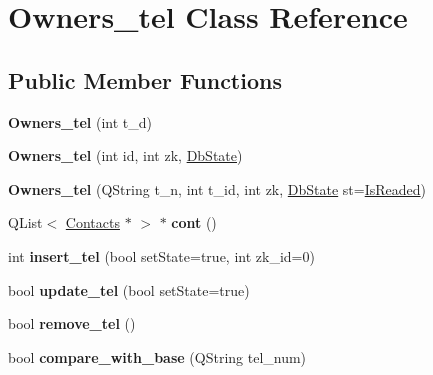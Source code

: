 \hypertarget{class_owners__tel}{}\section{Owners\+\_\+tel Class Reference}
\label{class_owners__tel}
\subsection*{Public Member Functions}
\begin{DoxyCompactItemize}
\item 
\mbox{\label{class_owners__tel_aee47f63acbceb924bba71ef318d2a377}} 
{\bfseries Owners\+\_\+tel} (int t\+\_\+d)
\item 
\mbox{\label{class_owners__tel_a80e3dd0faa358c821f4136983cae8b6e}} 
{\bfseries Owners\+\_\+tel} (int id, int zk, \mbox{\hyperlink{___contacts_8h_ad709f09dcd44386da4fec847f603fa4c}{Db\+State}})
\item 
\mbox{\label{class_owners__tel_a82ada689e8d87036c91aae6dec8ffced}} 
{\bfseries Owners\+\_\+tel} (Q\+String t\+\_\+n, int t\+\_\+id, int zk, \mbox{\hyperlink{___contacts_8h_ad709f09dcd44386da4fec847f603fa4c}{Db\+State}} st=\mbox{\hyperlink{___contacts_8h_ad709f09dcd44386da4fec847f603fa4ca7a5c75b2a8f2a851b0f1043a126a7cbf}{Is\+Readed}})
\item 
\mbox{\label{class_owners__tel_a144f5cc8476defe0ca73bfc783982c3f}} 
Q\+List$<$ \mbox{\hyperlink{class_contacts}{Contacts}} $\ast$ $>$ $\ast$ {\bfseries cont} ()
\item 
\mbox{\label{class_owners__tel_a2976d7803dcca977299a5b0ee3ea7e36}} 
int {\bfseries insert\+\_\+tel} (bool set\+State=true, int zk\+\_\+id=0)
\item 
\mbox{\label{class_owners__tel_add0227579da44b5d42bf2a8ba1dd113f}} 
bool {\bfseries update\+\_\+tel} (bool set\+State=true)
\item 
\mbox{\label{class_owners__tel_a26261f8e2571959b5da6531efe137d34}} 
bool {\bfseries remove\+\_\+tel} ()
\item 
\mbox{\label{class_owners__tel_a315385cfbec55d0a99735b0bfa5b29b7}} 
bool {\bfseries compare\+\_\+with\+\_\+base} (Q\+String tel\+\_\+num)
\end{DoxyCompactItemize}
